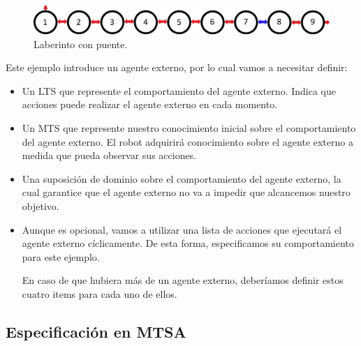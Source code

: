 \begin{figure}[H]
	\centering
		\includegraphics[width=1.0\textwidth]{Imagenes/Laberintos/puente.jpg}
	\caption{Laberinto con puente.}
	\label{fig:puente}
\end{figure}

Este ejemplo introduce un agente externo, por lo cual vamos a necesitar definir:

\begin{itemize}

\item
Un LTS que represente el comportamiento del agente externo. Indica que acciones puede realizar el agente externo en cada momento.

\item
Un MTS que represente nuestro conocimiento inicial sobre el comportamiento del agente externo. 
El robot adquirirá conocimiento sobre el agente externo a medida que pueda observar sus acciones.

\item
Una suposición de dominio sobre el comportamiento del agente externo, la cual garantice que el agente externo no va a impedir 
que alcancemos nuestro objetivo.

\item
Aunque es opcional, vamos a utilizar una lista de acciones que ejecutará el agente externo cíclicamente. 
De esta forma, especificamos su comportamiento para este ejemplo.

En caso de que hubiera más de un agente externo, deberíamos definir estos cuatro items para cada uno de ellos.

\end{itemize}

\clearpage

\subsection{Especificación en MTSA}

